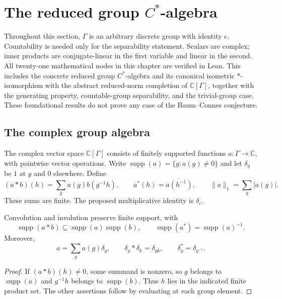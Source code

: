 \chapter{The reduced group $C^*$-algebra}
\label{ch:reduced-group-cstar}

Throughout this section, $\Gamma$ is an arbitrary discrete group with
identity $e$. Countability is needed only for the separability statement.
Scalars are complex; inner products are conjugate-linear in the first
variable and linear in the second. All twenty-one mathematical nodes in this chapter are verified in Lean.
This includes the concrete reduced group $C^*$-algebra and its canonical
isometric $*$-isomorphism with the abstract reduced-norm completion of
$\mathbb C[\Gamma]$, together with the generating property, countable-group
separability, and the trivial-group case. These foundational results do
not prove any case of the Baum--Connes conjecture.

\section{The complex group algebra}

\begin{definition}\label{def:group-algebra}
\leanok
The complex vector space $\mathbb C[\Gamma]$ consists of finitely supported
functions $a:\Gamma\to\mathbb C$, with pointwise vector operations.
Write $\operatorname{supp}(a)=\{g:a(g)\ne0\}$ and let $\delta_g$ be $1$
at $g$ and $0$ elsewhere. Define
\[
 (a*b)(h)=\sum_g a(g)b(g^{-1}h),\qquad
 a^*(h)=\overline{a(h^{-1})},\qquad
 \|a\|_1=\sum_g|a(g)|.
\]
These sums are finite. The proposed multiplicative identity is $\delta_e$.
\end{definition}

\begin{lemma}\label{lem:group-algebra-support}
\leanok
{}
Convolution and involution preserve finite support, with
\[
 \operatorname{supp}(a*b)\subseteq
 \operatorname{supp}(a)\operatorname{supp}(b),\qquad
 \operatorname{supp}(a^*)=\operatorname{supp}(a)^{-1}.
\]
Moreover,
\[
 a=\sum_g a(g)\delta_g,\qquad
 \delta_g*\delta_k=\delta_{gk},\qquad
 \delta_g^*=\delta_{g^{-1}}.
\]
\end{lemma}
\begin{proof}
\leanok
If $(a*b)(h)\ne0$, some summand is nonzero, so $g$ belongs to
$\operatorname{supp}(a)$ and $g^{-1}h$ belongs to $\operatorname{supp}(b)$.
Thus $h$ lies in the indicated finite product set.
The other assertions follow by evaluating at each group element.
\end{proof}


